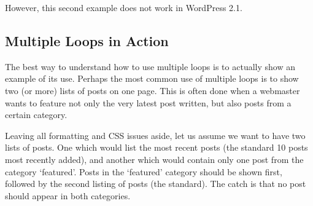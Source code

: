 However, this second example does not work in WordPress 2.1.

\subsection{Multiple Loops in Action}

The best way to understand how to use multiple loops is to actually show an example of its use. Perhaps the most common use of multiple loops is to show two (or more) lists of posts on one page. This is often done when a webmaster wants to feature not only the very latest post written, but also posts from a certain category.

Leaving all formatting and CSS issues aside, let us assume we want to have two lists of posts. One which would list the most recent posts (the standard 10 posts most recently added), and another which would contain only one post from the category ‘featured’. Posts in the ‘featured’ category should be shown first, followed by the second listing of posts (the standard). The catch is that no post should appear in both categories.

